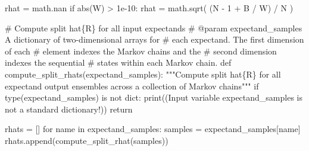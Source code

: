 \documentclass[
  letterpaper,
  DIV=11,
  numbers=noendperiod]{scrartcl}
\newenvironment{Shaded}{\begin{snugshade}}{\end{snugshade}}
\newcommand{\BuiltInTok}[1]{\textcolor[rgb]{0.00,0.23,0.31}{#1}}
\newcommand{\CommentTok}[1]{\textcolor[rgb]{0.37,0.37,0.37}{#1}}
\newcommand{\ControlFlowTok}[1]{\textcolor[rgb]{0.00,0.23,0.31}{#1}}
\newcommand{\DecValTok}[1]{\textcolor[rgb]{0.68,0.00,0.00}{#1}}
\newcommand{\FloatTok}[1]{\textcolor[rgb]{0.68,0.00,0.00}{#1}}
\newcommand{\KeywordTok}[1]{\textcolor[rgb]{0.00,0.23,0.31}{#1}}
\newcommand{\NormalTok}[1]{\textcolor[rgb]{0.00,0.23,0.31}{#1}}
\newcommand{\OperatorTok}[1]{\textcolor[rgb]{0.37,0.37,0.37}{#1}}
\newcommand{\StringTok}[1]{\textcolor[rgb]{0.13,0.47,0.30}{#1}}
\begin{document}
\begin{Shaded}
\begin{Highlighting}[]
\NormalTok{  rhat }\OperatorTok{=}\NormalTok{ math.nan}
  \ControlFlowTok{if} \BuiltInTok{abs}\NormalTok{(W) }\OperatorTok{\textgreater{}} \FloatTok{1e{-}10}\NormalTok{:}
\NormalTok{    rhat }\OperatorTok{=}\NormalTok{ math.sqrt( (N }\OperatorTok{{-}} \DecValTok{1} \OperatorTok{+}\NormalTok{ B }\OperatorTok{/}\NormalTok{ W) }\OperatorTok{/}\NormalTok{ N )}
  
\end{Highlighting}
\end{Shaded}

\begin{Shaded}
\begin{Highlighting}[]

\CommentTok{\# Compute split hat\{R\} for all input expectands}
\CommentTok{\# @param expectand\_samples A dictionary of two{-}dimensional arrays for }
\CommentTok{\#                          each expectand.  The first dimension of each}
\CommentTok{\#                          element indexes the Markov chains and the }
\CommentTok{\#                          second dimension indexes the sequential }
\CommentTok{\#                          states within each Markov chain.}
\KeywordTok{def}\NormalTok{ compute\_split\_rhats(expectand\_samples):}
  \CommentTok{"""Compute split hat\{R\} for all expectand output ensembles across}
\CommentTok{     a collection of Markov chains"""}
  \ControlFlowTok{if} \BuiltInTok{type}\NormalTok{(expectand\_samples) }\KeywordTok{is} \KeywordTok{not} \BuiltInTok{dict}\NormalTok{:}
    \BuiltInTok{print}\NormalTok{((}\StringTok{\textquotesingle{}Input variable \textasciigrave{}expectand\_samples\textasciigrave{} \textquotesingle{}}
           \StringTok{\textquotesingle{}is not a standard dictionary!\textquotesingle{}}\NormalTok{))}
    \ControlFlowTok{return}
    
\NormalTok{  rhats }\OperatorTok{=}\NormalTok{ []}
  \ControlFlowTok{for}\NormalTok{ name }\KeywordTok{in}\NormalTok{ expectand\_samples:}
\NormalTok{    samples }\OperatorTok{=}\NormalTok{ expectand\_samples[name]}
\NormalTok{    rhats.append(compute\_split\_rhat(samples))}
  
\end{Highlighting}
\end{Shaded}
\end{document}
